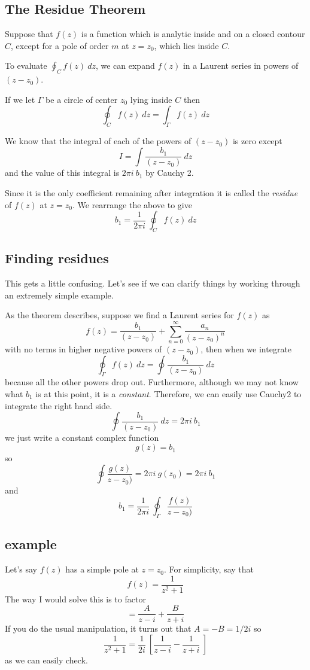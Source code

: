 \documentclass[11pt, oneside]{article}
\begin{document}
\subsection*{The Residue Theorem}
Suppose that $f(z)$ is a function which is analytic inside and on a closed contour $C$, except for a pole of order $m$ at $z=z_0$, which lies inside $C$.

To evaluate $\oint_C f(z) \ dz$, we can expand $f(z)$ in a Laurent series in powers of $(z-z_0)$.  

If we let $\Gamma$ be a circle of center $z_0$ lying inside $C$ then
\[ \oint_C f(z) \ dz = \int_{\Gamma} f(z) \ dz \]

We know that the integral of each of the powers of $(z-z_0)$ is zero except
\[ I = \int \frac{b_1}{(z-z_0)} \ dz \]
and the value of this integral is $2 \pi i \ b_1$ by Cauchy 2.

Since it is the only coefficient remaining after integration it is called the \emph{residue} of $f(z)$ at $z = z_0$.  We rearrange the above to give
\[ b_1 = \frac{1}{2 \pi i} \ \oint_C f(z) \ dz \]

\subsection*{Finding residues}
This gets a little confusing.  Let's see if we can clarify things by working through an extremely simple example.  

As the theorem describes, suppose we find a Laurent series for $f(z)$ as
\[ f(z) = \frac{b_1}{(z-z_0)} + \sum_{n=0}^{\infty} \frac{a_n}{(z-z_0)^n} \]
with no terms in higher negative powers of $(z-z_0)$, then when we integrate
\[ \oint_{\Gamma}  f(z) \ dz = \oint \frac{b_1}{(z-z_0)} \ dz \]
because all the other powers drop out.
Furthermore, although we may not know what $b_1$ is at this point, it is a \emph{constant}.  Therefore, we can easily use Cauchy2 to integrate the right hand side.
 \[ \oint \frac{b_1}{(z-z_0)} \ dz = 2 \pi i \ b_1 \]
 we just write a constant complex function
 \[ g(z) = b_1 \]
 so 
 \[ \oint \frac{g(z)}{z-z_0)} = 2 \pi i \ g(z_0) = 2 \pi i \ b_1 \]
and
\[ b_1 = \frac{1}{2 \pi i} \ \oint_{\Gamma} \frac{f(z)}{z-z_0)} \]

\subsection*{example}
Let's say $f(z)$ has a simple pole at $z = z_0$.  For simplicity, say that 
\[ f(z) = \frac{1}{z^2 + 1} \]
The way I would solve this is to factor
\[ = \frac{A}{z - i} + \frac{B}{z + i} \]
If you do the usual manipulation, it turns out that $A = -B = 1/2i$ so
\[ \frac{1}{z^2 + 1}  = \frac{1}{2i} \ [ \frac{1}{z - i} - \frac{1}{z + i} \ ] \]
as we can easily check.
\end{document}
